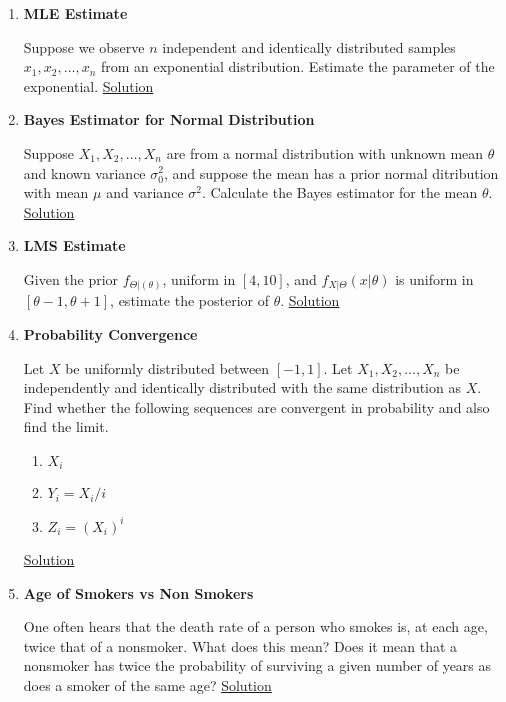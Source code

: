 \documentclass[../probability-notes.tex]{subfiles}
\begin{document}
\begin{enumerate}
    \item \hypertarget{q_mleestimate}{\textbf{MLE Estimate}}\newline
    Suppose we observe $n$ independent and identically distributed samples $x_{1}, x_{2}, \ldots, x_{n}$ from an exponential distribution. Estimate the parameter of the exponential. \hyperlink{a_mleestimate}{Solution}

    
    \item \hypertarget{q_bayesnormal}{\textbf{Bayes Estimator for Normal Distribution}}\newline
    Suppose $X_{1}, X_{2}, \ldots, X_{n}$ are from a normal distribution with unknown mean $\theta$ and known variance $\sigma_{0}^{2}$, and suppose the mean has a prior normal ditribution with mean $\mu$ and variance $\sigma^{2}$. Calculate the Bayes estimator for the mean $\theta$.
    \hyperlink{a_bayesnormal}{Solution}

    \item \hypertarget{q_lmsestimate}{\textbf{LMS Estimate}}\newline
    Given the prior $f_{\Theta|(\theta)}$, uniform in $[4,10]$, and $f_{X|\Theta}(x|\theta)$ is uniform in $[\theta-1, \theta+1]$, estimate the posterior of $\theta$. \hyperlink{a_lmsestimate}{Solution}

    
    \item \hypertarget{q_convergence}{\textbf{Probability Convergence}}\newline
    Let $X$ be uniformly distributed between $[-1,1]$. Let $X_{1}, X_{2},\ldots,X_{n}$ be independently and identically distributed with the same distribution as $X$. Find whether the following sequences are convergent in probability and also find the limit.
    \begin{enumerate}
        \item $X_{i}$
        \item $Y_{i} = X_{i}/i$
        \item $Z_{i} = (X_{i})^{i}$
    \end{enumerate}
    \hyperlink{a_convergence}{Solution}

    
    \item \hypertarget{q_lifesmoker}{\textbf{Age of Smokers vs Non Smokers}}\newline
    One often hears that the death rate of a person who smokes is, at each age, twice that of a nonsmoker. What does this mean? Does it mean that a nonsmoker has twice the probability of surviving a given number of years as does a smoker of the same age? \hyperlink{a_lifesmoker}{Solution}
    
    \end{enumerate}
\end{document}
